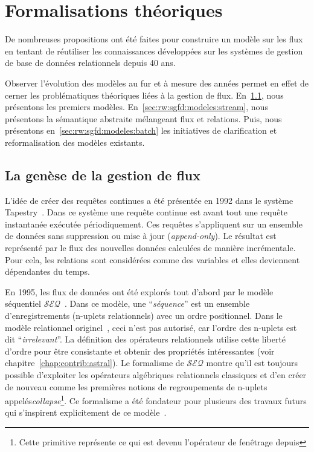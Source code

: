 \section{Formalisations théoriques}\label{sec:rw:sgfd:modeles}
De nombreuses propositions ont été faites pour construire un modèle sur les flux en tentant de réutiliser les connaissances développées sur les systèmes de gestion de base de données relationnels depuis 40 ans.

Observer l'évolution des modèles au fur et à mesure des années permet en effet de cerner les problématiques théoriques liées à la gestion de flux. En~\ref{sec:rw:sgfd:modeles:early}, nous présentons les premiers modèles. En~\ref{sec:rw:sgfd:modeles:stream}, nous présentons la sémantique abstraite mélangeant flux et relations. Puis, nous présentons en~\ref{sec:rw:sgfd:modeles:batch} les initiatives de clarification et reformalisation des modèles existants.

\subsection{La genèse de la gestion de flux}\label{sec:rw:sgfd:modeles:early}
L'idée de créer des requêtes continues a été présentée en 1992 dans le système Tapestry~\cite{Terry:tapestry}. Dans ce système une requête continue est avant tout une requête instantanée exécutée périodiquement. Ces requêtes s'appliquent sur un ensemble de données sans suppression ou mise à jour (\textit{append-only}). Le résultat est représenté par le flux des nouvelles données calculées de manière incrémentale. Pour cela, les relations sont considérées comme des variables et elles deviennent dépendantes du temps.

En 1995, les flux de données ont été explorés tout d'abord par le modèle séquentiel $\mathcal{SEQ}$~\cite{Seshadri:seq}. Dans ce modèle, une \enquote{\it séquence} est un ensemble d'enregistrements (n-uplets relationnels) avec un ordre positionnel. Dans le modèle relationnel originel~\cite{Codd:model}, ceci n'est pas autorisé, car l'ordre des n-uplets est dit \enquote{\it irrelevant}. La définition des opérateurs relationnels utilise cette liberté d'ordre pour être consistante et obtenir des propriétés intéressantes (voir chapitre~\ref{chap:contrib:astral}). Le formalisme de $\mathcal{SEQ}$ montre qu'il est toujours possible d'exploiter les opérateurs algébriques relationnels classiques et d'en créer de nouveau comme les premières notions de regroupements de n-uplets appelés\textit{collapse}\footnote{Cette primitive représente ce qui est devenu l'opérateur de fenêtrage depuis}. Ce formalisme a été fondateur pour plusieurs des travaux futurs qui s'inspirent explicitement de ce modèle~\cite{Gurgen:sstreamware,Babcock:issues}.

